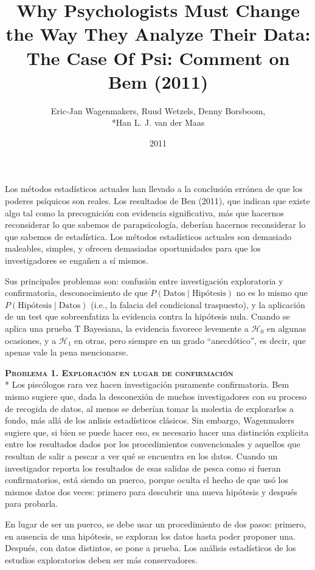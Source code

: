 \documentclass[a4paper,12pt]{article}
\title{Why Psychologists Must Change the Way They Analyze Their Data: The Case Of Psi: Comment on Bem (2011)}
\author{Eric-Jan Wagenmakers, Ruud Wetzels, Denny Borsboom,\\*Han L. J. van der Maas}
\date{2011}
\begin{document}
{\scshape\bfseries \maketitle}

Los métodos estadísticos actuales han llevado a la conclusión errónea de que los poderes psíquicos son reales. Los resultados de Ben (2011), que indican que existe algo tal como la precognición con evidencia significativa, más que hacernos reconsiderar lo que sabemos de parapsicología, deberían hacernos reconsiderar lo que sabemos de estadística. Los métodos estadísticos actuales son demasiado maleables, simples, y ofrecen demasiadas oportunidades para que los investigadores se engañen a sí mismos.

Sus principales problemas son: confusión entre investigación exploratoria y confirmatoria, desconocimiento de que $P(\mbox{Datos}\mid \mbox{Hipótesis})$ no es lo mismo que $P(\mbox{Hipótesis} \mid \mbox{Datos})$ (i.e., la falacia del condicional traspuesto), y la aplicación de un test que sobreenfatiza la evidencia contra la hipótesis nula. Cuando se aplica una prueba T Bayesiana, la evidencia favorece levemente a $\mathcal H_0$ en algunas ocasiones, y a $\mathcal H_1$ en otras, pero siempre en un grado ``anecdótico'', es decir, que apenas vale la pena mencionarse.

{\scshape\bfseries Problema 1. Exploración en lugar de confirmación}\\*
Los piscólogos rara vez hacen investigación puramente confirmatoria. Bem mismo sugiere que, dada la desconexión de muchos investigadores con su proceso de recogida de datos, al menos se deberían tomar la molestia de explorarlos a fondo, más allá de los anlisis estadísticos clásicos. Sin embargo, Wagenmakers sugiere que, si bien se puede hacer eso, es necesario hacer una distinción explícita entre los resultados dados por los procedimientos convencionales y aquellos que resultan de salir a pescar a ver qué se encuentra en los datos. Cuando un investigador reporta los resultados de esas salidas de pesca como si fueran confirmatorios, está siendo un puerco, porque oculta el hecho de que usó los mismos datos dos veces: primero para descubrir una nueva hipótesis y después para probarla.

En lugar de ser un puerco, se debe usar un procedimiento de dos pasos: primero, en ausencia de una hipótesis, se exploran los datos hasta poder proponer una. Después, con datos distintos, se pone a prueba. Los análisis estadísticos de los estudios exploratorios deben ser más conservadores.
\end{document}
